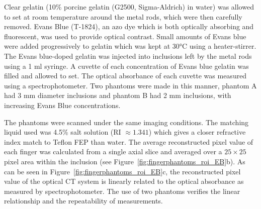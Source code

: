  
Clear gelatin (10\% porcine gelatin (G2500, Sigma-Aldrich) in water) was allowed to set at room temperature around the metal rods, which  were then carefully removed.  Evans Blue (T-1824), an azo dye which is both optically absorbing and  fluorescent, was used to provide optical contrast. Small amounts of Evans blue were added progressively to gelatin which was kept at 30\si{\degreeCelsius} using a heater-stirrer. The Evans blue-doped gelatin was injected into inclusions left by the metal rods using a 1 \si{\ml} syringe. A cuvette of each concentration of Evans blue gelatin  was filled and allowed to set. The optical absorbance of each cuvette was measured using a spectrophotometer. Two phantoms were made in this manner, phantom A had 3 mm diameter inclusions and phantom B had 2 mm inclusions, with increasing Evans Blue concentrations.

The phantoms were scanned under the same imaging conditions. The matching liquid used was 4.5\% salt solution (RI $\approx 1.341$) which  gives a closer refractive index  match to Teflon FEP than water. The average reconstructed pixel value of each finger was calculated from a single axial slice and averaged over a $25 \times 25$ pixel area within the inclusion (see Figure~\ref{fig:fingerphantoms_roi_EB}b).
As can be seen in Figure~\ref{fig:fingerphantoms_roi_EB}c, the reconstructed pixel value of the optical CT system is linearly related to the optical absorbance as measured by  spectrophotometer.   The use of two phantoms verifies the linear relationship and the repeatability of measurements.  

